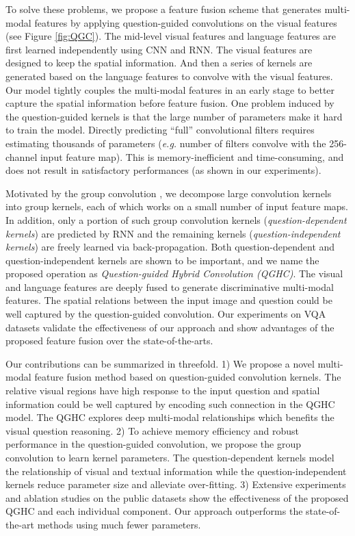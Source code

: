 \documentclass[runningheads]{llncs}
\begin{document}
To solve these problems, we propose a feature fusion scheme that generates multi-modal features by applying question-guided convolutions on the visual features (see Figure \ref{fig:QGC}). The mid-level visual features and language features are first learned independently using CNN and RNN. The visual features are designed to keep the spatial information. And then a series of kernels are generated based on the language features to convolve with the visual features.
Our model tightly couples the multi-modal features in an early stage to better capture the spatial information before feature fusion. 
One problem induced by the question-guided kernels is that the large number of parameters make it hard to train the model. Directly predicting ``full'' convolutional filters requires estimating thousands of parameters (\textit{e.g.}  number of  filters convolve with the 256-channel input feature map). This is memory-inefficient and time-consuming, and does not result in satisfactory performances (as shown in our experiments).

Motivated by the group convolution \cite{chollet2016xception,krizhevsky2012imagenet,xie2016aggregated}, we decompose large convolution kernels into group kernels, each of which works on a small number of input feature maps. In addition, only a portion of such group convolution kernels (\emph{question-dependent kernels}) are predicted by RNN and the remaining kernels (\emph{question-independent kernels}) are freely learned via back-propagation. Both question-dependent and question-independent 
kernels are shown to be important, and we name the proposed operation as \emph{Question-guided Hybrid Convolution (QGHC)}. The visual and language features are deeply fused to generate discriminative multi-modal features. The spatial relations between the input image and question could be well captured by the question-guided convolution. Our experiments on VQA datasets validate the effectiveness of our approach and show advantages of the proposed feature fusion over the state-of-the-arts.

Our contributions can be summarized in threefold. 1) We propose a novel multi-modal feature fusion method based on question-guided convolution kernels. The relative visual regions have high response to the input question and spatial information could be well captured by encoding such connection in the QGHC model. The QGHC explores deep multi-modal relationships which benefits the visual question reasoning.
2) To achieve memory efficiency and robust performance in the question-guided convolution, we propose the group convolution to learn kernel parameters. The question-dependent kernels model the relationship of visual and textual information while the question-independent kernels reduce parameter size and alleviate over-fitting.
3) Extensive experiments and ablation studies on the public datasets show the effectiveness of the proposed QGHC and each individual component. Our approach outperforms the state-of-the-art methods using much fewer parameters.
\end{document}

